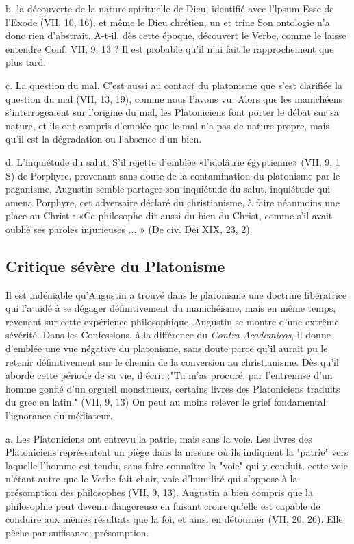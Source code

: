b.	la découverte de la nature spirituelle de Dieu, identifié avec l'lpsum Esse de l'Exode (VII, 10, 16), et même le Dieu chrétien, un et trine  Son ontologie n'a donc rien d'abstrait. A-t-il, dès cette époque, découvert le Verbe, comme le laisse entendre Conf. VII, 9, 13 ? Il est probable qu'il n'ai fait le rapprochement que plus tard.

c.	La question du mal. C'est aussi au contact du platonisme que s'est clarifiée la question du mal (VII, 13, 19), comme nous l'avons vu. Alors que les manichéens s'interrogeaient sur l'origine du mal, les Platoniciens font porter le débat sur sa nature, et ils ont compris d'emblée que le mal n'a pas de nature propre, mais qu'il est la dégradation ou l'absence d'un bien.

d.	L'inquiétude  du salut.  S'il rejette d'emblée «l'idolâtrie égyptienne» (VII, 9, 1 S) de Porphyre, provenant sans doute de la contamination du platonisme par le paganisme, Augustin semble partager son inquiétude du salut, inquiétude qui amena Porphyre, cet adversaire déclaré du christianisme, à faire néanmoins une place au Christ : «Ce philosophe dit aussi du bien du Christ, comme s'il avait oublié ses paroles injurieuses ... » (De civ. Dei XIX, 23, 2).

\subsection{Critique  sévère  du Platonisme}

Il est indéniable qu'Augustin a trouvé dans le platonisme une doctrine libératrice qui l'a aidé à se dégager définitivement du manichéisme, mais en même temps, revenant sur cette expérience philosophique, Augustin se montre d'une extrême sévérité. Dans les Confessions, à la différence du \textit{Contra Academicos}, il donne d'emblée une vue négative  du  platonisme, sans doute parce qu'il aurait pu le retenir définitivement
sur le chemin de la conversion au christianisme. Dès qu'il aborde cette période de sa vie, il  écrit :"Tu m'as procuré, par l'entremise  d'un homme  gonflé  d'un orgueil monstrueux, certains livres des Platoniciens traduits du grec en latin." (VII, 9, 13)
On peut au moins relever le grief fondamental: l'ignorance du médiateur.

a.	Les Platoniciens ont entrevu la patrie, mais sans  la voie. Les livres des Platoniciens représentent un piège dans la mesure où ils indiquent la "patrie" vers laquelle l'homme est tendu, sans faire connaître la "voie" qui y conduit, cette voie n'étant autre que le Verbe fait chair, voie d'humilité qui s'oppose à la présomption des philosophes (VII, 9, 13). Augustin a bien compris que la philosophie peut devenir dangereuse en faisant croire qu'elle est capable de conduire aux mêmes résultats que la foi, et ainsi en détourner (VII, 20, 26). Elle pêche par suffisance, présomption.

